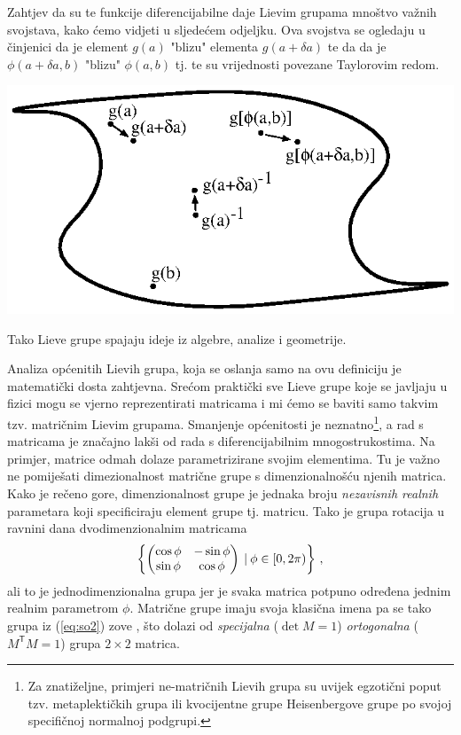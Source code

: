 Zahtjev da su te funkcije diferencijabilne daje Lievim grupama mnoštvo važnih svojstava,
kako ćemo vidjeti u sljedećem odjeljku.
Ova svojstva se ogledaju
u činjenici da je element $g(a)$ "blizu" elementa $g(a+\delta a)$ te da
da je $\phi(a+\delta a, b)$
"blizu" $\phi(a,b)$ tj. te su vrijednosti povezane Taylorovim redom.
\centerline{\includegraphics[scale=1.0]{pics/lieva_mnogostrukost.eps}}
Tako Lieve grupe spajaju ideje iz algebre, analize i geometrije.

Analiza općenitih Lievih grupa, koja se oslanja samo na ovu definiciju
je matematički dosta zahtjevna. Srećom praktički sve Lieve grupe koje se javljaju
u fizici mogu se vjerno reprezentirati matricama i mi ćemo se baviti
samo takvim tzv. matričnim Lievim grupama. Smanjenje općenitosti je neznatno\footnote{Za
    znatiželjne, primjeri ne-matričnih Lievih grupa su uvijek egzotični
    poput tzv. metaplektičkih grupa ili kvocijentne grupe Heisenbergove grupe po
    svojoj specifičnoj normalnoj podgrupi.},
a rad s matricama je značajno lakši od rada s diferencijabilnim mnogostrukostima.
Na primjer, matrice odmah dolaze parametrizirane svojim elementima. Tu je važno
ne pomiješati dimezionalnost matrične grupe s dimenzionalnošću njenih matrica.
Kako je rečeno gore, dimenzionalnost grupe je jednaka broju \emph{nezavisnih realnih}
parametara koji specificiraju element grupe tj. matricu. Tako je grupa rotacija
u ravnini dana dvodimenzionalnim matricama
\begin{equation}
    \left\{ \begin{pmatrix}
        \cos\phi & -\sin\phi \\
        \sin\phi & \cos\phi 
    \end{pmatrix} 
     \: | \: \phi \in [0, 2\pi) \right\} \,,
    \label{eq:so2}
\end{equation}
ali to je jednodimenzionalna grupa jer je svaka matrica potpuno određena
jednim realnim parametrom $\phi$. Matrične grupe imaju svoja klasična
imena pa se tako grupa iz (\ref{eq:so2}) zove , što dolazi
od \emph{specijalna} ($\det M = 1$) \emph{ortogonalna} ($M^\mathsf{T} M = 1$) 
grupa $2\times 2$ matrica.



